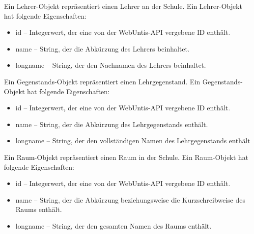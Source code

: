 Ein Lehrer-Objekt repräsentiert einen Lehrer an der Schule. Ein Lehrer-Objekt hat folgende Eigenschaften: 

\begin{itemize}
    \item id -- Integerwert, der eine von der WebUntis-API vergebene ID enthält.
    \item name -- String, der die Abkürzung des Lehrers beinhaltet.
    \item longname -- String, der den Nachnamen des Lehrers beinhaltet. 
\end{itemize}


Ein Gegenstands-Objekt repräsentiert einen Lehrgegenstand. Ein Gegenstands-Objekt hat folgende Eigenschaften: 

\begin{itemize}
    \item id -- Integerwert, der eine von der WebUntis-API vergebene ID enthält. 
    \item name -- String, der die Abkürzung des Lehrgegenstands enthält.
    \item longname -- String, der den vollständigen Namen des Lehrgegenstands enthält
\end{itemize}


\pagebreak

Ein Raum-Objekt repräsentiert einen Raum in der Schule. Ein Raum-Objekt hat folgende Eigenschaften: 

\begin{itemize}
    \item id -- Integerwert, der eine von der WebUntis-API vergebene ID enthält.
    \item name -- String, der die Abkürzung beziehungsweise die Kurzschreibweise des Raums enthält.
    \item longname -- String, der den gesamten Namen des Raums enthält. 
\end{itemize}